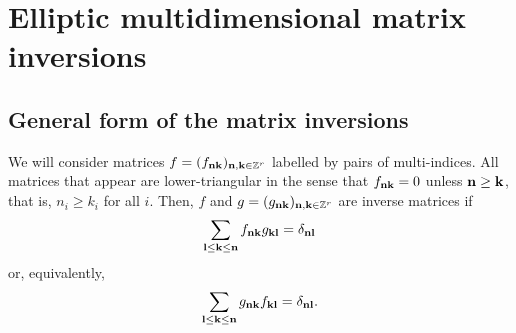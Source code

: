 \section{Elliptic multidimensional matrix inversions}\label{mis}


\subsection{General form of the matrix inversions}
\label{gmis}


We will consider matrices
 $f=(f_{\bf nk})_{{\bf n}, {\bf k}\in\mathbb Z^r}$
labelled by pairs of multi-indices. All matrices that appear are
lower-triangular in the sense that $f_{\bf nk}=0$ unless $\bf
n\geq\bf k$, that is, $n_i\geq k_i$ for all $i$. Then,
$f$ and $g=(g_{\bf nk})_{{\bf n}, {\bf k}\in\mathbb Z^r}$
are inverse matrices if
\begin{gather}\label{fg}
\sum_{\bf l\leq k\leq n}f_{\bf nk}g_{\bf kl}=\delta_{\bf nl} \end{gather}
or, equivalently,
\begin{gather*}
\sum_{\bf l\leq k\leq n}g_{\bf nk}f_{\bf kl}=\delta_{\bf nl}.
\end{gather*}
